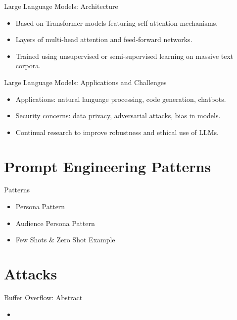 \documentclass[t,ignorenonframetext]{beamer}
\begin{document}
\begin{frame}{Large Language Models: Architecture}
\begin{itemize}
\item Based on Transformer models featuring self-attention mechanisms.
\item Layers of multi-head attention and feed-forward networks.
\item Trained using unsupervised or semi-supervised learning on massive text corpora.
\end{itemize}
\end{frame}

\begin{frame}{Large Language Models: Applications and Challenges}
\begin{itemize}
\item Applications: natural language processing, code generation, chatbots.
\item Security concerns: data privacy, adversarial attacks, bias in models.
\item Continual research to improve robustness and ethical use of LLMs.
\end{itemize}
\end{frame}
\section{Prompt Engineering Patterns}
\begin{frame}{Patterns}
\begin{itemize}
\item Persona Pattern
\item Audience Persona Pattern
\item Few Shots \& Zero Shot Example
\end{itemize}
\end{frame} 

\section{Attacks}
\begin{frame}{Buffer Overflow: Abstract}
\begin{itemize}
    \item 
\end{itemize}
\end{frame}
\end{document}
